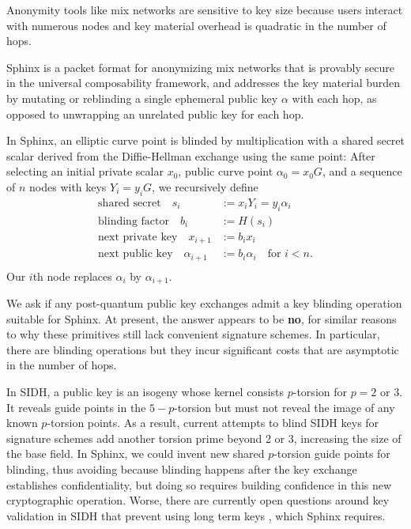\documentclass[twoside,letterpaper]{llncs}
\def\mathcomma{}
\begin{document}
Anonymity tools like mix networks are sensitive to key size because 
users interact with numerous nodes and key material overhead is 
quadratic in the number of hops. %

\smallskip

Sphinx \cite{Sphinx} is a packet format for anonymizing mix networks
that is provably secure in the universal composability framework, and
 addresses the key material burden by mutating or reblinding a
 single ephemeral public key $\alpha$ with each hop,
 as opposed to unwrapping an unrelated public key for each hop.

In Sphinx, an elliptic curve point is blinded by multiplication with
a shared secret scalar derived from the Diffie-Hellman exchange using
the same point:
After selecting an initial private scalar $x_0$,
 public curve point $\alpha_0 = x_0 G$, and 
 a sequence of $n$ nodes with keys $Y_i = y_i G$,
we recursively define 
\[ \begin{aligned}
\textrm{shared secret}\quad
 s_i &:= x_i Y_i = y_i \alpha_i \mathcomma \\
\textrm{blinding factor}\quad
 b_i &:= H(s_i) \mathcomma \\
\textrm{next private key}\quad
 x_{i+1} &:= b_i x_i \mathcomma \\ %
\textrm{next public key}\quad
 \alpha_{i+1} &:= b_i \alpha_i \quad\textrm{for $i < n$.} \\
\end{aligned} \]
Our $i$th node replaces $\alpha_i$ by $\alpha_{i+1}$.

\smallskip

We ask if any post-quantum public key exchanges admit 
a key blinding operation suitable for Sphinx. 
At present, the answer appears to be {\bf no}, for similar reasons to
why these primitives still lack convenient signature schemes. 
In particular, there are blinding operations but they incur significant
costs  that are asymptotic in the number of hops.

In SIDH, a public key is an isogeny whose kernel consists $p$-torsion
for $p=2$ or $3$.  It reveals guide points in the $5-p$-torsion but
must not reveal the image of any known $p$-torsion points.  
As a result, current attempts to blind SIDH keys for signature schemes
add another torsion prime beyond 2 or 3, increasing the size of the
base field.  In Sphinx, we could invent new shared $p$-torsion guide
points for blinding, thus avoiding  because blinding happens after the key exchange
establishes confidentiality, but doing so requires building confidence
in this new cryptographic operation.  Worse, there are currently open
questions around key validation in SIDH that prevent using long term
keys \cite{SIDH-NoValidation}, which Sphinx requires.
\end{document}
